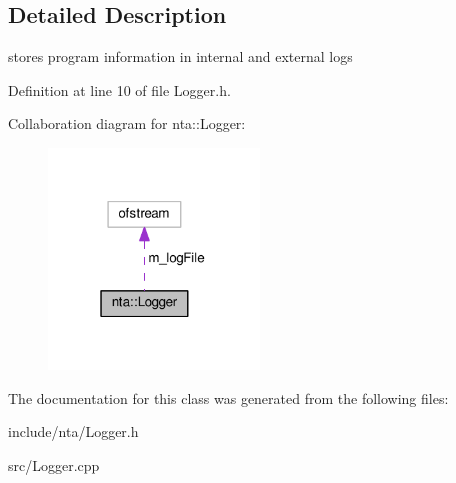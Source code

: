 \subsection{Detailed Description}
stores program information in internal and external logs 

Definition at line 10 of file Logger.\+h.



Collaboration diagram for nta\+:\+:Logger\+:\nopagebreak
\begin{figure}[H]
\begin{center}
\leavevmode
\includegraphics[width=159pt]{d4/d22/classnta_1_1Logger__coll__graph}
\end{center}
\end{figure}


The documentation for this class was generated from the following files\+:\begin{DoxyCompactItemize}
\item 
include/nta/Logger.\+h\item 
src/Logger.\+cpp\end{DoxyCompactItemize}
